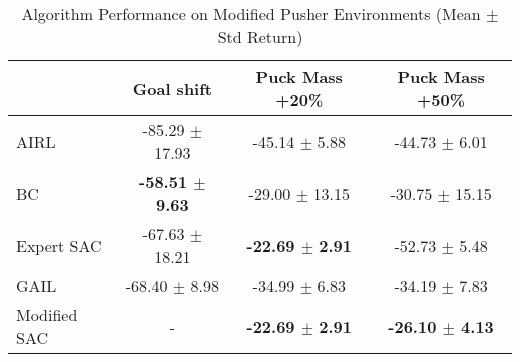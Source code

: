 \documentclass{article}
\begin{document}
\pagestyle{empty}

\begin{table}
\caption{Algorithm Performance on Modified Pusher Environments (Mean $\pm$ Std Return)}
\label{tab:perf_mod_pusher}
\begin{adjustbox}{max width=\textwidth, center}
\begin{tabular}{lccc}
\toprule
 & Goal shift & Puck Mass +20\% & Puck Mass +50\% \\
\midrule
AIRL & -85.29 $\pm$ 17.93 & -45.14 $\pm$ 5.88 & -44.73 $\pm$ 6.01 \\
BC & \textbf{-58.51 $\pm$ 9.63} & -29.00 $\pm$ 13.15 & -30.75 $\pm$ 15.15 \\
Expert SAC & -67.63 $\pm$ 18.21 & \textbf{-22.69 $\pm$ 2.91} & -52.73 $\pm$ 5.48 \\
GAIL & -68.40 $\pm$ 8.98 & -34.99 $\pm$ 6.83 & -34.19 $\pm$ 7.83 \\
Modified SAC & - & \textbf{-22.69 $\pm$ 2.91} & \textbf{-26.10 $\pm$ 4.13} \\
\bottomrule
\end{tabular}
\end{adjustbox}
\end{table}
\end{document}
